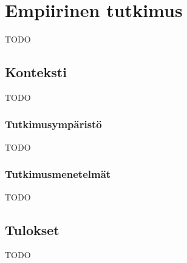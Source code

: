 \vspace{21.5pt}
\chapter{Empiirinen tutkimus}
TODO

\section{Konteksti}

TODO

\subsection{Tutkimusympäristö}

TODO

\subsection{Tutkimusmenetelmät}

TODO

\section{Tulokset}

TODO